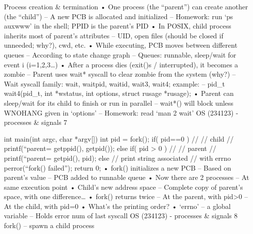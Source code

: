 Process creation & termination
• One process (the “parent”) can create another (the “child”)
– A new PCB is allocated and initialized
– Homework: run ‘ps auxwww’ in the shell; PPID is the parent’s PID
• In POSIX, child process inherits most of parent’s attributes
– UID, open files (should be closed if unneeded; why?), cwd, etc.
• While executing, PCB moves between different queues
– According to state change graph 
– Queues: runnable, sleep/wait for event i (i=1,2,3…)
• After a process dies (exit()s / interrupted), it becomes a zombie
– Parent uses wait* syscall to clear zombie from the system (why?)
– Wait syscall family: wait, waitpid, waitid, wait3, wait4; example:
– pid_t wait4(pid_t, int *wstatus, int options, struct rusage *rusage); 
• Parent can sleep/wait for its child to finish or run in parallel
– wait*() will block unless WNOHANG given in ‘options’
– Homework: read ‘man 2 wait’
OS (234123) - processes & signals
7

int main(int argc, char *argv[])
{
  int pid = fork();
  if( pid==0 ) { 
   //
   // child
      //
      printf(“parent=%
             getppid(), getpid());
  }
  else if( pid > 0 ) {
      //
      // parent
      //
      printf(“parent=%
             getpid(), pid);
  }
  else { // print string associated
         // with errno   
      perror(“fork() failed”); 
  }
  return 0;
}
• fork() initializes a new PCB
– Based on parent’s value
– PCB added to runnable queue
• Now there are 2 processes
– At same execution point
• Child’s new address space 
– Complete copy of parent’s 
space, with one difference…
• fork() returns twice
– At the parent, with pid>0
– At the child, with pid=0
• What’s the printing order?
• ‘errno’ – a global variable
– Holds error num of last syscall
OS (234123) - processes & signals
8
fork() – spawn a child process
